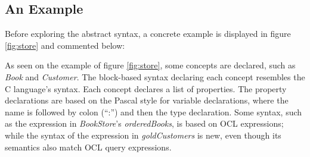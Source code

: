 \subsection{An Example}\label{subsec:example}

Before exploring the abstract syntax, a concrete example is displayed in figure \ref{fig:store} and commented below:

\pagebreak



As seen on the example of figure \ref{fig:store}, some concepts are declared, such as \emph{Book} and \emph{Customer}. 
The block-based syntax declaring each concept resembles the C \cite{clang} language's syntax. 
Each concept declares a list of properties.
The property declarations are based on the Pascal \cite{pascal} style for variable declarations, where the name is followed by colon (``:'') and then the type declaration.
Some syntax, such as the expression in \emph{BookStore}'s \emph{orderedBooks}, is based on OCL \cite{ocl} expressions; while the syntax of the expression in \emph{goldCustomers} is new, even though its semantics also match OCL \cite{ocl} query expressions.

